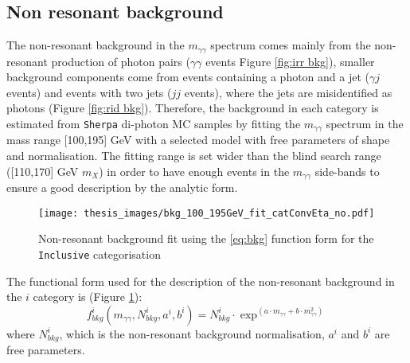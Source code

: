 \documentclass[a4paper, oneside, 11pt, openright]{book}
\begin{document}
 			\subsection{Non resonant background}
 				The non-resonant background in the $m_{\gamma\gamma}$ spectrum comes mainly from the non-resonant production of photon pairs ($\gamma\gamma$ events Figure \ref{fig:irr bkg}), smaller background components come from events containing a photon and a jet ($\gamma j$ events) and events with two jets ($jj$ events), where the jets are misidentified as photons (Figure \ref{fig:rid bkg}). Therefore, the background in each category is estimated from \texttt{Sherpa} di-photon MC samples by fitting the $m_{\gamma\gamma}$ spectrum in the mass range [100,195] GeV with a selected model with free parameters of shape and normalisation. The fitting range is set wider than the blind search range ([110,170] GeV $m_X$) in order to have enough events in the $m_{\gamma\gamma}$ side-bands to ensure a good description by the analytic form.
 				
 				\begin{figure}[h]
 					\centering
 					\texttt{[image: thesis\_images/bkg\_100\_195GeV\_fit\_catConvEta\_no.pdf]}
 					\caption{Non-resonant background fit using the \ref{eq:bkg} function form for the \texttt{Inclusive} categorisation}
 					\label{fig:bkg_fit}
 				\end{figure}
 				The functional form used for the description of the non-resonant background in the $i$ category is (Figure \ref{fig:bkg_fit}):
 				\begin{equation}\label{eq:bkg}
 					f^i_{bkg}(m_{\gamma\gamma},N_{bkg}^i,a^i,b^i) = N_{bkg}^i\cdot\exp^{(a\cdot m_{\gamma\gamma}+b\cdot m_{\gamma\gamma}^2)}
 				\end{equation}
 				where $N_{bkg}^i$, which is the non-resonant background normalisation, $a^i$ and $b^i$ are free parameters.
 				
\end{document}
